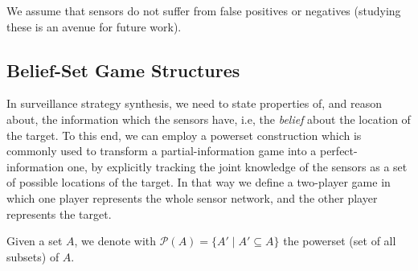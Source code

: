 We assume that sensors do not suffer from  false positives or negatives (studying these is an avenue for future work). 


\subsection{Belief-Set Game Structures}\label{sec:belief-gs}

In surveillance strategy synthesis, we need to state properties of, and reason about, the information which the sensors have, i.e, the \emph{belief} about the location of the target. To this end, we can employ a powerset construction which is commonly used to transform a partial-information game into a perfect-information one, by explicitly tracking the joint knowledge of the sensors as a set of possible locations of the target. In that way we define a two-player game in which one player represents the whole sensor network, and the other player represents the target.

Given a set $A$, we denote with $\mathcal{P}(A) = \{A' \mid A'\subseteq A\}$ the powerset (set of all subsets) of $A$.

